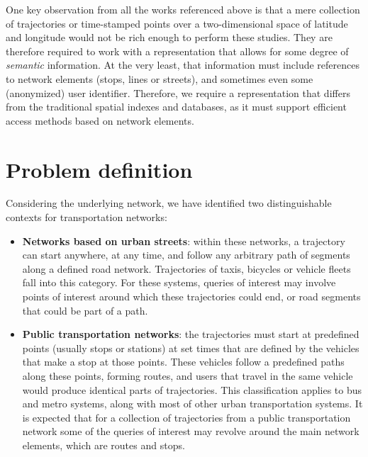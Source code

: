 \documentclass[a4paper,10pt,twoside]{book}
\begin{document}
	One key observation from all the works referenced above is that a mere collection of trajectories or time-stamped points over a two-dimensional space of latitude and longitude would not be rich enough to perform these studies. They are therefore required to work with a representation that allows for some degree of \textit{semantic} information. At the very least, that information must include references to network elements (stops, lines or streets), and sometimes even some (anonymized) user identifier. Therefore, we require a representation that differs from the traditional spatial indexes and databases, as it must support efficient access methods based on network elements.
	
	\section{Problem definition}
	\label{sec:pd}
	Considering the underlying network, we have identified two distinguishable contexts for transportation networks:
	\begin{itemize}
	    \item \textbf{Networks based on urban streets}: within these networks, a trajectory can start anywhere, at any time, and follow any arbitrary path of segments along a defined road network.
	    Trajectories of taxis, bicycles or vehicle fleets fall into this category. For these systems, queries of interest may involve points of interest around which these trajectories could end, or road segments that could be part of a path.
	    \item \textbf{Public transportation networks}: the trajectories must start at predefined points (usually stops or stations) at set times that are defined by the vehicles that make a stop at those points. These vehicles follow a predefined paths along these points, forming routes,  and users that travel in the same vehicle would produce identical parts of trajectories. 
	    This classification applies to bus and metro systems, along with most of other urban transportation systems. It is expected that for a collection of trajectories from a public transportation network some of the queries of interest may revolve around the main network elements, which are routes and stops.
	\end{itemize}
	
\end{document}
